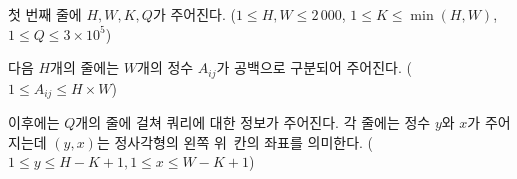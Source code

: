 첫 번째 줄에 $H, W, K, Q$가 주어진다. ($1 \le H, W \le 2\,000$, $1 \le K \le \min(H, W)$, $1 \le Q \le 3 \times 10^5 $)

다음 $H$개의 줄에는 $W$개의 정수 $A_{ij}$가 공백으로 구분되어 주어진다. ($1 \le A_{ij} \le H \times W $)

이후에는 $Q$개의 줄에 걸쳐 쿼리에 대한 정보가 주어진다. 각 줄에는 정수 $y$와 $x$가 주어지는데 $(y, x)$는 정사각형의 왼쪽 위 칸의 좌표를 의미한다.
($1 \le y \le H - K + 1, 1 \le x \le W - K + 1$)